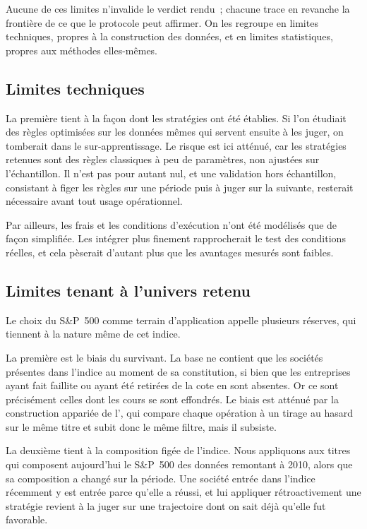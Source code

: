Aucune de ces limites n'invalide le verdict rendu~; chacune trace en revanche
la frontière de ce que le protocole peut affirmer. On les regroupe en limites
techniques, propres à la construction des données, et en limites statistiques,
propres aux méthodes elles-mêmes.

\subsection*{Limites techniques}

La première tient à la façon dont les stratégies ont été établies. Si l'on
étudiait des règles optimisées sur les données mêmes qui servent ensuite à les
juger, on tomberait dans le sur-apprentissage. Le risque est ici atténué, car
les stratégies retenues sont des règles classiques à peu de paramètres, non
ajustées sur l'échantillon. Il n'est pas pour autant nul, et une validation
hors échantillon, consistant à figer les règles sur une période puis à juger
sur la suivante, resterait nécessaire avant tout usage opérationnel.

Par ailleurs, les frais et les conditions d'exécution n'ont été modélisés que
de façon simplifiée. Les intégrer plus finement rapprocherait le test des
conditions réelles, et cela pèserait d'autant plus que les avantages mesurés
sont faibles.

\subsection*{Limites tenant à l'univers retenu}

Le choix du S\&P~500 comme terrain d'application appelle plusieurs réserves,
qui tiennent à la nature même de cet indice.

La première est le biais du survivant. La base ne contient que les sociétés
présentes dans l'indice au moment de sa constitution, si bien que les
entreprises ayant fait faillite ou ayant été retirées de la cote en sont
absentes. Or ce sont précisément celles dont les cours se sont effondrés. Le
biais est atténué par la construction appariée de l'\edgevar{}, qui compare
chaque opération à un tirage au hasard sur le même titre et subit donc le même
filtre, mais il subsiste.

La deuxième tient à la composition figée de l'indice. Nous appliquons aux
titres qui composent aujourd'hui le S\&P~500 des données remontant à 2010,
alors que sa composition a changé sur la période. Une société entrée dans
l'indice récemment y est entrée parce qu'elle a réussi, et lui appliquer
rétroactivement une stratégie revient à la juger sur une trajectoire dont on
sait déjà qu'elle fut favorable.

